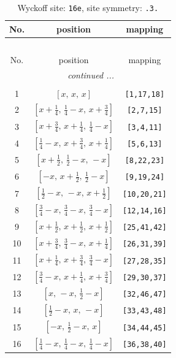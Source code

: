 \documentclass[fleqn,8pt]{jsarticle}
\begin{document}
\begin{longtable}{ccc}
\caption{Wyckoff site: {\tt 16e}, site symmetry: {\tt .3.}}
 \\
 \hline \hline
No. & position & mapping \\ \hline \endfirsthead

\multicolumn{2}{l}{\tablename\ \thetable{}} \\
 \hline \hline
No. & position & mapping \\ \hline \endhead

 \hline \hline
\multicolumn{2}{r}{\footnotesize\it continued ...} \\ \endfoot

 \hline \hline
\multicolumn{2}{r}{} \\ \endlastfoot

1 & $\left[ x,\, x,\, x \right]$ & {\tt [1,17,18]} \\ \hline
2 & $\left[ x + \frac{1}{4},\, \frac{1}{4} - x,\, x + \frac{3}{4} \right]$ & {\tt [2,7,15]} \\ \hline
3 & $\left[ x + \frac{3}{4},\, x + \frac{1}{4},\, \frac{1}{4} - x \right]$ & {\tt [3,4,11]} \\ \hline
4 & $\left[ \frac{1}{4} - x,\, x + \frac{3}{4},\, x + \frac{1}{4} \right]$ & {\tt [5,6,13]} \\ \hline
5 & $\left[ x + \frac{1}{2},\, \frac{1}{2} - x,\, - x \right]$ & {\tt [8,22,23]} \\ \hline
6 & $\left[ - x,\, x + \frac{1}{2},\, \frac{1}{2} - x \right]$ & {\tt [9,19,24]} \\ \hline
7 & $\left[ \frac{1}{2} - x,\, - x,\, x + \frac{1}{2} \right]$ & {\tt [10,20,21]} \\ \hline
8 & $\left[ \frac{3}{4} - x,\, \frac{3}{4} - x,\, \frac{3}{4} - x \right]$ & {\tt [12,14,16]} \\ \hline
9 & $\left[ x + \frac{1}{2},\, x + \frac{1}{2},\, x + \frac{1}{2} \right]$ & {\tt [25,41,42]} \\ \hline
10 & $\left[ x + \frac{3}{4},\, \frac{3}{4} - x,\, x + \frac{1}{4} \right]$ & {\tt [26,31,39]} \\ \hline
11 & $\left[ x + \frac{1}{4},\, x + \frac{3}{4},\, \frac{3}{4} - x \right]$ & {\tt [27,28,35]} \\ \hline
12 & $\left[ \frac{3}{4} - x,\, x + \frac{1}{4},\, x + \frac{3}{4} \right]$ & {\tt [29,30,37]} \\ \hline
13 & $\left[ x,\, - x,\, \frac{1}{2} - x \right]$ & {\tt [32,46,47]} \\ \hline
14 & $\left[ \frac{1}{2} - x,\, x,\, - x \right]$ & {\tt [33,43,48]} \\ \hline
15 & $\left[ - x,\, \frac{1}{2} - x,\, x \right]$ & {\tt [34,44,45]} \\ \hline
16 & $\left[ \frac{1}{4} - x,\, \frac{1}{4} - x,\, \frac{1}{4} - x \right]$ & {\tt [36,38,40]} \\
\end{longtable}
\end{document}
